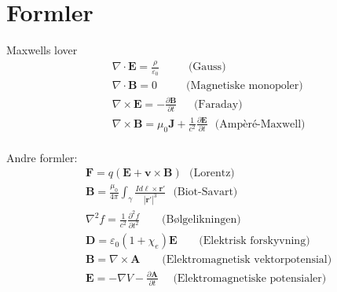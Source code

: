 \documentclass[twoside,utf8]{article}
\begin{document}
\newpage



\part*{Formler}

\begin{multicols}{2}
Maxwells lover
\begin{equation*}
\begin{aligned}
& \nabla \cdot \mathbf{E} = \frac{\rho}{\varepsilon_0}
\ \ \ \ \ \ \ \ \ \ \ \ \text{(Gauss)} \\
& \nabla \cdot \mathbf{B} = 0
\ \ \ \ \ \ \ \ \ \ \ \ \text{(Magnetiske monopoler)}  \\
& \nabla \times \mathbf{E} = -\frac{\partial \mathbf{B}}{\partial t}
\ \ \ \ \ \ \ \text{(Faraday)} \\
& \nabla \times \mathbf{B} = \mu_0 \mathbf{J} + \frac{1}{c^2}\frac{\partial \mathbf{E}}{\partial t}
\ \ \  \text{(Ampèré-Maxwell)}   \\
\end{aligned}
\end{equation*}

Andre formler:
\begin{equation*}
\begin{aligned}
& \mathbf{F} = q\left(\mathbf{E}+\mathbf{v}\times \mathbf{B}\right)
\ \ \  \text{(Lorentz)}  \\
& \mathbf{B} = \frac{\mu_0}{4\pi}\int_\gamma \frac{I d\mathbf{\ell} \times \mathbf{r}'}{|\mathbf{r}'|^3}
\ \ \  \text{(Biot-Savart)}  \\
& \nabla^2 f = \frac{1}{c^2} \frac{\partial^2 f}{\partial t^2}
\ \ \ \ \ \ \ \ \ \text{(Bølgelikningen)} \\
& \mathbf{D} = \varepsilon_0 (1+\chi_e)\mathbf{E}
\ \ \ \ \ \ \ \ \ \text{(Elektrisk forskyvning)} \\
& \mathbf{B} = \nabla \times \mathbf{A}
\ \ \ \ \ \ \ \ \ \text{(Elektromagnetisk vektorpotensial)} \\
& \mathbf{E} = -\nabla V - \frac{\partial \mathbf{A}}{\partial t}
\ \ \ \ \ \  \text{(Elektromagnetiske potensialer)} \\
\end{aligned}
\end{equation*}

\end{multicols}
\end{document}
